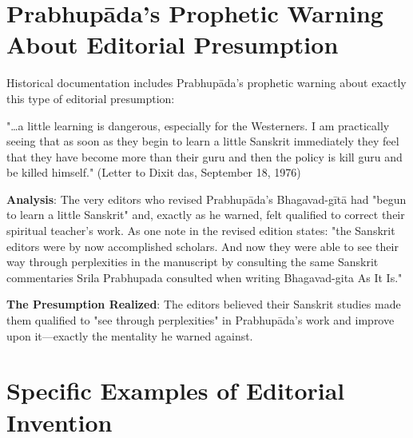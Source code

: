 \documentclass[11pt,twoside]{book}
\begin{document}
\section*{Prabhupāda's Prophetic Warning About Editorial Presumption}
\label{sec:org1477c45}

Historical documentation includes Prabhupāda's prophetic warning about exactly this type of editorial presumption:

"\ldots{}a little learning is dangerous, especially for the Westerners. I am practically seeing that as soon as they begin to learn a little Sanskrit immediately they feel that they have become more than their guru and then the policy is kill guru and be killed himself." (Letter to Dixit das, September 18, 1976)

\textbf{\textbf{Analysis}}: The very editors who revised Prabhupāda's Bhagavad-gītā had "begun to learn a little Sanskrit" and, exactly as he warned, felt qualified to correct their spiritual teacher's work. As one note in the revised edition states: "the Sanskrit editors were by now accomplished scholars. And now they were able to see their way through perplexities in the manuscript by consulting the same Sanskrit commentaries Srila Prabhupada consulted when writing Bhagavad-gita As It Is."

\textbf{\textbf{The Presumption Realized}}: The editors believed their Sanskrit studies made them qualified to "see through perplexities" in Prabhupāda's work and improve upon it—exactly the mentality he warned against.
\section*{Specific Examples of Editorial Invention}
\label{sec:org954fed0}
\end{document}
